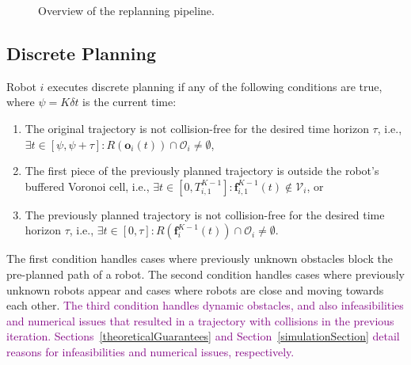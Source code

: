 \documentclass{svproc}
\newcommand{\vf}{\mathbf{f}}
\newcommand{\vo}{\mathbf{o}}
\newcommand{\cV}{\mathcal{V}}
\newcommand{\cO}{\mathcal{O}}
\newcommand{\todo}[1]{\textbf{\textcolor{red}{TODO: #1}}}
\newcommand{\changed}[1]{\textcolor{purple}{#1}}
\begin{document}
\begin{figure}
{
}
\caption{Overview of the replanning pipeline.
}
\label{fig:flowchart}
\end{figure}


\subsection{Discrete Planning} \label{discretePlanning}


Robot $i$ executes discrete planning if any of the following conditions are true, where $\psi=K\delta t$ is the current time:
\begin{enumerate}
    \item The original trajectory is not collision-free for the desired time horizon $\tau$, i.e., $\exists t\in [\psi,\psi+\tau] : R(\vo_i(t)) \cap \cO_i \neq \emptyset$,
    \item The first piece of the previously planned trajectory is outside the robot's buffered Voronoi cell, i.e., $\exists t\in [0, T^{K-1}_{i,1}] : \vf^{K-1}_{i,1}(t) \not\in \cV_i$, or
    \item The previously planned trajectory is not collision-free for the desired time horizon $\tau$, i.e., $\exists t\in [0,\tau] :  R(\vf^{K-1}_i(t)) \cap \cO_i \neq \emptyset$.
\end{enumerate}
The first condition handles cases where previously unknown obstacles block the pre-planned path of a robot. The second condition handles cases where previously unknown robots appear and cases where robots are close and moving towards each other. \changed{The third condition handles dynamic obstacles, and  also infeasibilities and numerical issues that resulted in a trajectory with collisions in the previous iteration. 
Sections~\ref{theoreticalGuarantees} and Section~\ref{simulationSection} detail reasons for infeasibilities and  numerical issues, respectively.}
\end{document}
